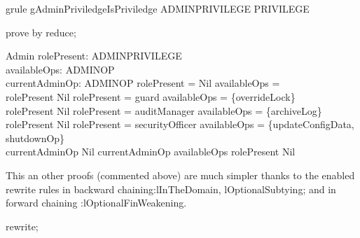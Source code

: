 \begin{theorem}{grule gAdminPriviledgeIsPriviledge}
ADMINPRIVILEGE \in  \power  PRIVILEGE
\end{theorem}

\begin{zproof}[gAdminPriviledgeIsPriviledge]
prove by reduce;
\end{zproof}

\begin{schema}{Admin}
  rolePresent: \Optional ADMINPRIVILEGE\\
  availableOps: \power  ADMINOP\\
  currentAdminOp: \Optional ADMINOP
\where
  rolePresent = Nil \implies  availableOps = \emptyset\\
  rolePresent \neq  Nil \land  \The rolePresent = guard \implies  availableOps = \{overrideLock\}\\
  rolePresent \neq  Nil \land  \The rolePresent = auditManager \implies  availableOps = \{archiveLog\}\\
  rolePresent \neq  Nil \land  \The rolePresent = securityOfficer \implies  availableOps = \{updateConfigData, shutdownOp\}\\
  currentAdminOp \neq  Nil \implies  \The currentAdminOp \in  availableOps \land  rolePresent \neq  Nil
\end{schema}

This an other proofs (commented above) are much simpler thanks to
the enabled rewrite rules in backward chaining:lInTheDomain,
lOptionalSubtying; and in forward chaining :lOptionalFinWeakening.
%
\begin{zproof}
rewrite;
\end{zproof}

